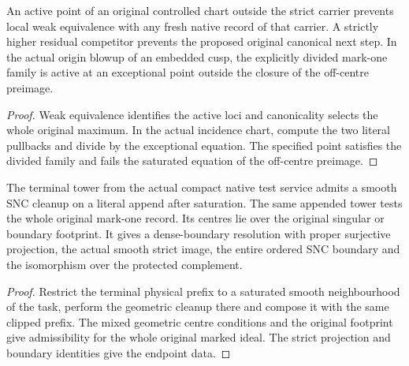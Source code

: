 \begin{theorem}
\label{hir:g8-original-chronological-restart-obstruction}
\leanok
An active point of an original controlled chart outside the
strict carrier prevents local weak equivalence with any fresh
native record of that carrier. A strictly higher residual
competitor prevents the proposed original canonical next step.
In the actual origin blowup of an embedded cusp, the explicitly
divided mark-one family is active at an exceptional point
outside the closure of the off-centre preimage.
\end{theorem}
\begin{proof}
Weak equivalence identifies the active loci and canonicality
selects the whole original maximum. In the actual incidence
chart, compute the two literal pullbacks and divide by the
exceptional equation. The specified point satisfies the divided
family and fails the saturated equation of the off-centre
preimage.
\end{proof}

\begin{theorem}
\label{hir:g8-native-terminal-original-test-snc}
\leanok
The terminal tower from the actual compact native test service
admits a smooth SNC cleanup on a literal append after saturation.
The same appended tower tests the whole original mark-one record.
Its centres lie over the original singular or boundary footprint.
It gives a dense-boundary resolution with proper surjective
projection, the actual smooth strict image, the entire ordered SNC
boundary and the isomorphism over the protected complement.
\end{theorem}
\begin{proof}
Restrict the terminal physical prefix to a saturated smooth
neighbourhood of the task, perform the geometric cleanup there
and compose it with the same clipped prefix. The mixed
geometric centre conditions and the original footprint give
admissibility for the whole original marked ideal. The strict
projection and boundary identities give the endpoint data.
\end{proof}

